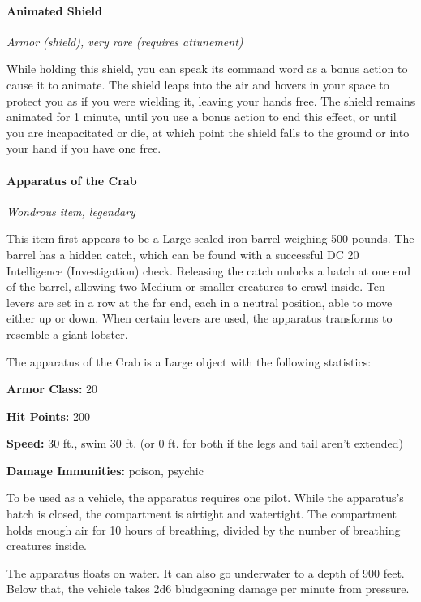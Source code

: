\documentclass[
]{article}
\begin{document}
\hypertarget{animated-shield}{%
\paragraph{Animated Shield}\label{animated-shield}}

\emph{Armor (shield), very rare (requires attunement)}

While holding this shield, you can speak its command word as a bonus
action to cause it to animate. The shield leaps into the air and hovers
in your space to protect you as if you were wielding it, leaving your
hands free. The shield remains animated for 1 minute, until you use a
bonus action to end this effect, or until you are incapacitated or die,
at which point the shield falls to the ground or into your hand if you
have one free.

\hypertarget{apparatus-of-the-crab}{%
\paragraph{Apparatus of the Crab}\label{apparatus-of-the-crab}}

\emph{Wondrous item, legendary}

This item first appears to be a Large sealed iron barrel weighing 500
pounds. The barrel has a hidden catch, which can be found with a
successful DC 20 Intelligence (Investigation) check. Releasing the catch
unlocks a hatch at one end of the barrel, allowing two Medium or smaller
creatures to crawl inside. Ten levers are set in a row at the far end,
each in a neutral position, able to move either up or down. When certain
levers are used, the apparatus transforms to resemble a giant lobster.

The apparatus of the Crab is a Large object with the following
statistics:

\textbf{Armor Class:} 20

\textbf{Hit Points:} 200

\textbf{Speed:} 30 ft., swim 30 ft. (or 0 ft. for both if the legs and
tail aren't extended)

\textbf{Damage Immunities:} poison, psychic

To be used as a vehicle, the apparatus requires one pilot. While the
apparatus's hatch is closed, the compartment is airtight and watertight.
The compartment holds enough air for 10 hours of breathing, divided by
the number of breathing creatures inside.

The apparatus floats on water. It can also go underwater to a depth of
900 feet. Below that, the vehicle takes 2d6 bludgeoning damage per
minute from pressure.
\end{document}
